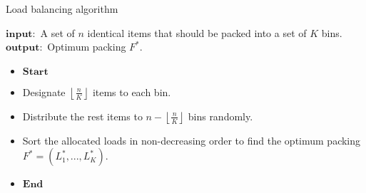 \begin{algorithm}

\caption{Load balancing algorithm}

$\mathbf{input:}$ A set of $n$ identical items that should be packed into a set of $K$ bins.\\
$\mathbf{output:}$ Optimum packing $F^*$.
\begin{itemize}
\item[] $\mathbf{Start}$ 
\item[] Designate $\left\lfloor {\frac{n}{K}} \right\rfloor $ items to each bin.

\item[] Distribute the rest items to $n-\left\lfloor {\frac{n}{K}} \right\rfloor$ bins randomly. 

\item[] Sort the allocated loads in non-decreasing order to find the optimum packing $F^* = ({L^*_1},...,{L^*_K})$.
\item[] $\mathbf{End}$
\end{itemize}

\end{algorithm}

